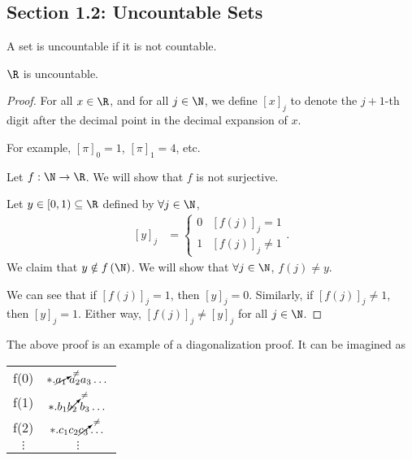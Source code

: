 \documentclass[10pt]{mypackage}
\begin{document}
\subsection{Section 1.2: Uncountable Sets}%
\begin{definition}
A set is uncountable if it is not countable.
\end{definition}
\begin{theorem}[Uncountability of $\R$]
  $\R$ is uncountable.
\end{theorem}
\begin{proof}
  For all $x\in \R$, and for all $j\in\N$, we define $\left[x\right]_j$ to denote the $j+1$-th digit after the decimal point in the decimal expansion of $x$.\newline

  For example, $\left[\pi\right]_0 = 1$, $\left[\pi\right]_1 = 4$, etc.\newline

  Let $f: \N\rightarrow \R$. We will show that $f$ is not surjective.\newline

  Let $y\in [0,1)\subseteq \R$ defined by $\forall j\in \N$,
  \begin{align*}
    \left[y\right]_j &= \begin{cases}
      0 & \left[f(j)\right]_j = 1\\
      1 & \left[f(j)\right]_j \neq 1
    \end{cases}.
  \end{align*}
  We claim that $y\notin f\left(\N\right)$. We will show that $\forall j\in \N$, $f(j) \neq y$.\newline

  We can see that if $\left[f(j)\right]_j = 1$, then $\left[y\right]_j = 0$. Similarly, if $\left[f(j)\right]_j\neq 1$, then $\left[y\right]_j = 1$. Either way, $\left[f(j)\right]_j \neq \left[y\right]_j$ for all $j\in\N$.
\end{proof}
\begin{remark}
The above proof is an example of a diagonalization proof. It can be imagined as
\begin{center}
  \renewcommand{\arraystretch}{1.5}
  \begin{tabular}{c|c}
    f(0) & $\ast.\cancelto{\neq}{a_1}\:a_2a_3\dots$\\
    f(1) & $\ast.b_1\cancelto{\neq}{b_2}\:b_3\dots$\\
    f(2) & $\ast.c_1c_2\cancelto{\neq}{c_3}\dots$\\
    $\vdots$ & $\vdots$
  \end{tabular}
\end{center}
\end{remark}
\end{document}
